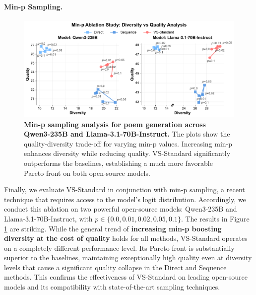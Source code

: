 \paragraph{Min-p Sampling.}
\begin{figure}[ht]
    \centering
    \includegraphics[width=1.0\linewidth]{figures/ablation/decoding_strategies/min_p_ablation_comparison.pdf}
    \caption{\textbf{Min-p sampling analysis for poem generation across Qwen3-235B and Llama-3.1-70B-Instruct.} The plots show the quality-diversity trade-off for varying min-p values. Increasing min-p enhances diversity while reducing quality. VS-Standard significantly outperforms the baselines, establishing a much more favorable Pareto front on both open-source models.}
    \label{fig:min_p_ablation}
\end{figure}

Finally, we evaluate VS-Standard in conjunction with min-p sampling, a recent technique that requires access to the model's logit distribution. Accordingly, we conduct this ablation on two powerful open-source models: Qwen3-235B and Llama-3.1-70B-Instruct, with $p \in \{0.0, 0.01, 0.02, 0.05, 0.1\}$. The results in Figure \ref{fig:min_p_ablation} are striking. While the general trend of \textbf{increasing min-p boosting diversity at the cost of quality} holds for all methods, VS-Standard operates on a completely different performance level. Its Pareto front is substantially superior to the baselines, maintaining exceptionally high quality even at diversity levels that cause a significant quality collapse in the Direct and Sequence methods. This confirms the effectiveness of VS-Standard on leading open-source models and its compatibility with state-of-the-art sampling techniques.


\clearpage
